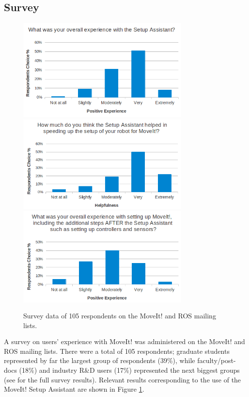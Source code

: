 \documentclass[10pt,journal,compsoc]{joser1}
\begin{document}
{\subsection{Survey}
\label{sec::survey}

\begin{figure}[!t]
\centering
\includegraphics[width=3.4in]{coleman_20131110_f14}
\includegraphics[width=3.4in]{coleman_20131110_f15}
\includegraphics[width=3.4in]{coleman_20131110_f16}
\caption{Survey data of 105 respondents on the MoveIt! and ROS mailing lists.}
\label{fig:setup_assistant_positive}
\end{figure} 

A survey on users' experience with MoveIt! was administered on the MoveIt! and
ROS mailing lists. There were a total of 105 respondents; graduate students
represented by far the largest group of respondents (39\%), while
faculty/post-docs (18\%) and industry R\&D users (17\%) represented the next
biggest groups (see \cite{moveit} for the full survey results). Relevant results
corresponding to the use of the MoveIt! Setup Assistant are shown in Figure
\ref{fig:setup_assistant_positive}. 

}
\end{document}
